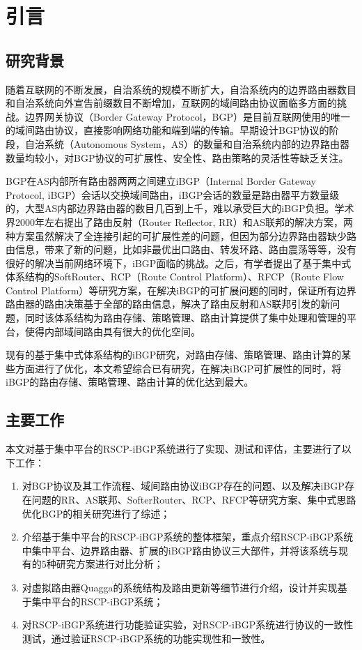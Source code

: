 \chapter{引言}
\label{cha:intro}


\section{研究背景}

随着互联网的不断发展，自治系统的规模不断扩大，自治系统内的边界路由器数目和自治系统向外宣告前缀数目不断增加，互联网的域间路由协议面临多方面的挑战。边界网关协议（Border Gateway Protocol，BGP）是目前互联网使用的唯一的域间路由协议，直接影响网络功能和端到端的传输。早期设计BGP协议的阶段，自治系统（Autonomous System，AS）的数量和自治系统内部的边界路由器数量均较小，对BGP协议的可扩展性、安全性、路由策略的灵活性等缺乏关注。

BGP在AS内部所有路由器两两之间建立iBGP（Internal Border Gateway Protocol, iBGP）会话以交换域间路由，iBGP会话的数量是路由器平方数量级的，大型AS内部边界路由器的数目几百到上千，难以承受巨大的iBGP负担。学术界2000年左右提出了路由反射（Router Reflector, RR）和AS联邦的解决方案，两种方案虽然解决了全连接引起的可扩展性差的问题，但因为部分边界路由器缺少路由信息，带来了新的问题，比如非最优出口路由、转发环路、路由震荡等等，没有很好的解决当前网络环境下，iBGP面临的挑战。之后，有学者提出了基于集中式体系结构的SoftRouter、RCP（Route Control Platform）、RFCP（Route Flow Control Platform）等研究方案，在解决iBGP的可扩展问题的同时，保证所有边界路由器的路由决策基于全部的路由信息，解决了路由反射和AS联邦引发的新问题，同时该体系结构为路由存储、策略管理、路由计算提供了集中处理和管理的平台，使得内部域间路由具有很大的优化空间。

现有的基于集中式体系结构的iBGP研究，对路由存储、策略管理、路由计算的某些方面进行了优化，本文希望综合已有研究，在解决iBGP可扩展性的同时，将iBGP的路由存储、策略管理、路由计算的优化达到最大。

\section{主要工作}

本文对基于集中平台的RSCP-iBGP系统进行了实现、测试和评估，主要进行了以下工作：
\begin{enumerate}
\item 对BGP协议及其工作流程、域间路由协议iBGP存在的问题、以及解决iBGP存在问题的RR、AS联邦、SofterRouter、RCP、RFCP等研究方案、集中式思路优化BGP的相关研究进行了综述；
\item 介绍基于集中平台的RSCP-iBGP系统的整体框架，重点介绍RSCP-iBGP系统中集中平台、边界路由器、扩展的iBGP路由协议三大部件，并将该系统与现有的5种研究方案进行对比分析；
\item 对虚拟路由器Quagga的系统结构及路由更新等细节进行介绍，设计并实现基于集中平台的RSCP-iBGP系统；
\item 对RSCP-iBGP系统进行功能验证实验，对RSCP-iBGP系统进行协议的一致性测试，通过验证RSCP-iBGP系统的功能实现性和一致性。
\end{enumerate}



